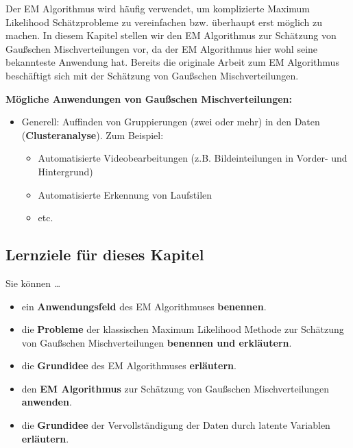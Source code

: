 \documentclass[
  ngerman,
]{book}
\providecommand{\tightlist}{%
  \setlength{\itemsep}{0pt}\setlength{\parskip}{0pt}}
\begin{document}
Der EM Algorithmus wird häufig verwendet, um komplizierte Maximum Likelihood Schätzprobleme zu vereinfachen bzw. überhaupt erst möglich zu machen. In diesem Kapitel stellen wir den EM Algorithmus zur Schätzung von Gaußschen Mischverteilungen vor, da der EM Algorithmus hier wohl seine bekannteste Anwendung hat. Bereits die originale Arbeit zum EM Algorithmus \citep{Dempster_1977} beschäftigt sich mit der Schätzung von Gaußschen Mischverteilungen.

\textbf{Mögliche Anwendungen von Gaußschen Mischverteilungen:}

\begin{itemize}
\item
  Generell: Auffinden von Gruppierungen (zwei oder mehr) in den Daten (\textbf{Clusteranalyse}). Zum Beispiel:

  \begin{itemize}
  \tightlist
  \item
    Automatisierte Videobearbeitungen (z.B. Bildeinteilungen in Vorder- und Hintergrund)
  \item
    Automatisierte Erkennung von Laufstilen
  \item
    etc.
  \end{itemize}
\end{itemize}

\hypertarget{lernziele-fuxfcr-dieses-kapitel}{%
\subsection*{Lernziele für dieses Kapitel}\label{lernziele-fuxfcr-dieses-kapitel}}

Sie können \ldots{}

\begin{itemize}
\tightlist
\item
  ein \textbf{Anwendungsfeld} des EM Algorithmuses \textbf{benennen}.
\item
  die \textbf{Probleme} der klassischen Maximum Likelihood Methode zur Schätzung von Gaußschen Mischverteilungen \textbf{benennen und erkläutern}.
\item
  die \textbf{Grundidee} des EM Algorithmuses \textbf{erläutern}.
\item
  den \textbf{EM Algorithmus} zur Schätzung von Gaußschen Mischverteilungen \textbf{anwenden}.
\item
  die \textbf{Grundidee} der Vervollständigung der Daten durch latente Variablen \textbf{erläutern}.
\end{itemize}
\end{document}
